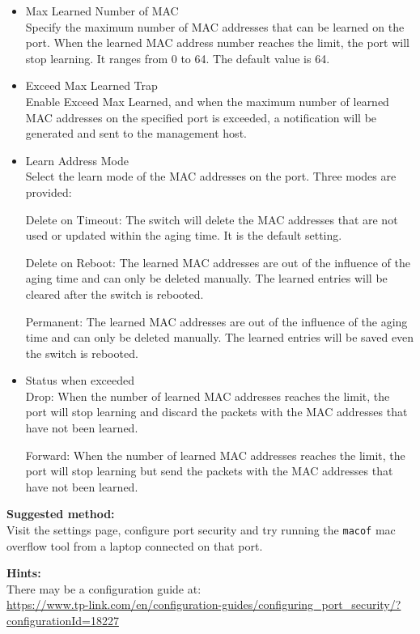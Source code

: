 \documentclass[a4paper,11pt,notitlepage]{report}
\begin{document}
\begin{itemize}
\item Max Learned Number of MAC\\

Specify the maximum number of MAC addresses that can be learned on the port. When the learned MAC address number reaches the limit, the port will stop learning. It ranges from 0 to 64. The default value is 64.

\item Exceed Max Learned Trap\\

Enable Exceed Max Learned, and when the maximum number of learned MAC addresses on the specified port is exceeded, a notification will be generated and sent to the management host.

\item Learn Address Mode\\

Select the learn mode of the MAC addresses on the port. Three modes are provided:

Delete on Timeout: The switch will delete the MAC addresses that are not used or updated within the aging time. It is the default setting.

Delete on Reboot: The learned MAC addresses are out of the influence of the aging time and can only be deleted manually. The learned entries will be cleared after the switch is rebooted.

Permanent: The learned MAC addresses are out of the influence of the aging time and can only be deleted manually. The learned entries will be saved even the switch is rebooted.

\item Status when exceeded\\
Drop: When the number of learned MAC addresses reaches the limit, the port will stop learning and discard the packets with the MAC addresses that have not been learned.

Forward: When the number of learned MAC addresses reaches the limit, the port will stop learning but send the packets with the MAC addresses that have not been learned.
\end{itemize}

{\bf Suggested method:}\\
Visit the settings page, configure port security and try running the \verb+macof+ mac overflow tool from a laptop connected on that port.

{\bf Hints:}\\
There may be a configuration guide at:\\
{\small\url{https://www.tp-link.com/en/configuration-guides/configuring_port_security/?configurationId=18227}}
\end{document}
